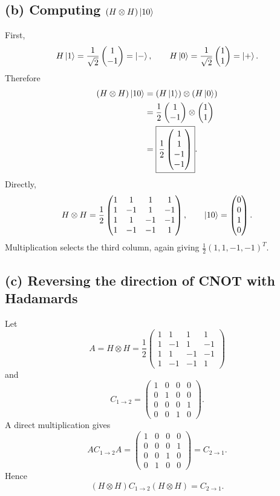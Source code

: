 \documentclass[11pt,a4paper]{article}
\begin{document}
\subsection*{(b) Computing $(H\otimes H)\ket{10}$}
First,
\[
H\ket1=\frac1{\sqrt2}\begin{pmatrix}1\\-1\end{pmatrix}=\ket-,
\qquad
H\ket0=\frac1{\sqrt2}\begin{pmatrix}1\\1\end{pmatrix}=\ket+.
\]
Therefore
\begin{align*}
(H\otimes H)\ket{10}
&=(H\ket1)\otimes(H\ket0)\\
&=\frac12
\begin{pmatrix}1\\-1\end{pmatrix}
\otimes
\begin{pmatrix}1\\1\end{pmatrix}\\
&=\boxed{\frac12
\begin{pmatrix}1\\1\\-1\\-1\end{pmatrix}}.
\end{align*}
Directly,
\[
H\otimes H=\frac12
\begin{pmatrix}
1&1&1&1\\
1&-1&1&-1\\
1&1&-1&-1\\
1&-1&-1&1
\end{pmatrix},
\qquad
\ket{10}=\begin{pmatrix}0\\0\\1\\0\end{pmatrix}.
\]
Multiplication selects the third column, again giving
$\frac12(1,1,-1,-1)^T$.

\subsection*{(c) Reversing the direction of CNOT with Hadamards}
Let
\[
A=H\otimes H=\frac12
\begin{pmatrix}
1&1&1&1\\
1&-1&1&-1\\
1&1&-1&-1\\
1&-1&-1&1
\end{pmatrix}
\]
and
\[
C_{1\to2}=
\begin{pmatrix}
1&0&0&0\\
0&1&0&0\\
0&0&0&1\\
0&0&1&0
\end{pmatrix}.
\]
A direct multiplication gives
\[
A C_{1\to2} A
=
\begin{pmatrix}
1&0&0&0\\
0&0&0&1\\
0&0&1&0\\
0&1&0&0
\end{pmatrix}
=C_{2\to1}.
\]
Hence
\[
\boxed{(H\otimes H)C_{1\to2}(H\otimes H)=C_{2\to1}}.
\]
\end{document}
